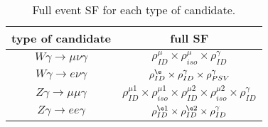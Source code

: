 \begin{table}[h]
  \footnotesize
  \begin{center}
  \caption{Full event SF for each type of candidate.} 
   \begin{tabular}{|c|c|}
\hline
 type of candidate                  &   full SF\\ \hline
 $W\gamma\rightarrow\mu\nu\gamma$   &   $\rho^{\mu}_{ID} \times \rho^{\mu}_{iso} \times \rho^{\gamma}_{ID}$    \\ \hline
 $W\gamma\rightarrow e\nu\gamma$    &   $\rho^{\e}_{ID} \times \rho^{\gamma}_{ID}\times \rho^{\gamma}_{PSV}$       \\ \hline
 $Z\gamma\rightarrow\mu\mu\gamma$   &   $\rho^{\mu1}_{ID} \times \rho^{\mu1}_{iso} \times \rho^{\mu2}_{ID} \times \rho^{\mu2}_{iso} \times \rho^{\gamma}_{ID}$      \\ \hline
 $Z\gamma\rightarrow ee\gamma$      &   $\rho^{\e1}_{ID} \times \rho^{\e2}_{ID} \times \rho^{\gamma}_{ID}$      \\ \hline
  \end{tabular}
  \label{tab:SFs_Applied}
  \end{center}
\end{table}
